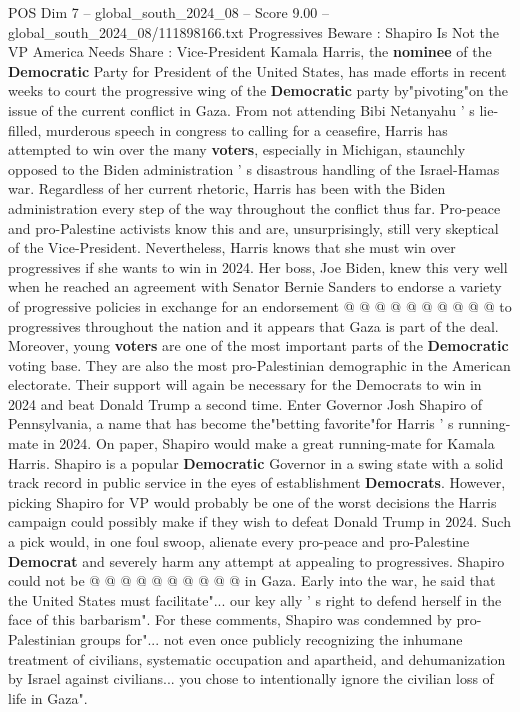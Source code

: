 \begin{textsample}{POS Dim 7 – global\_south\_2024\_08 – Score 9.00 – global\_south\_2024\_08/111898166.txt}  \label{ex:f7_pos_186}
Progressives Beware : Shapiro Is Not the VP America Needs Share : Vice-President Kamala Harris, the \textbf{nominee} of the \textbf{Democratic} Party for President of the United States, has made efforts in recent weeks to court the progressive wing of the \textbf{Democratic} party by"pivoting"on the issue of the current conflict in Gaza.
From not attending Bibi Netanyahu ' s lie-filled, murderous speech in congress to calling for a ceasefire, Harris has attempted to win over the many \textbf{voters}, especially in Michigan, staunchly opposed to the Biden administration ' s disastrous handling of the Israel-Hamas war.
Regardless of her current rhetoric, Harris has been with the Biden administration every step of the way throughout the conflict thus far.
Pro-peace and pro-Palestine activists know this and are, unsurprisingly, still very skeptical of the Vice-President.
Nevertheless, Harris knows that she must win over progressives if she wants to win in 2024.
Her boss, Joe Biden, knew this very well when he reached an agreement with Senator Bernie Sanders to endorse a variety of progressive policies in exchange for an endorsement @ @ @ @ @ @ @ @ @ @ to progressives throughout the nation and it appears that Gaza is part of the deal.
Moreover, young \textbf{voters} are one of the most important parts of the \textbf{Democratic} voting base.
They are also the most pro-Palestinian demographic in the American electorate.
Their support will again be necessary for the Democrats to win in 2024 and beat Donald Trump a second time.
Enter Governor Josh Shapiro of Pennsylvania, a name that has become the"betting favorite"for Harris ' s running-mate in 2024.
On paper, Shapiro would make a great running-mate for Kamala Harris.
Shapiro is a popular \textbf{Democratic} Governor in a swing state with a solid track record in public service in the eyes of establishment \textbf{Democrats}.
However, picking Shapiro for VP would probably be one of the worst decisions the Harris campaign could possibly make if they wish to defeat Donald Trump in 2024.
Such a pick would, in one foul swoop, alienate every pro-peace and pro-Palestine \textbf{Democrat} and severely harm any attempt at appealing to progressives.
Shapiro could not be @ @ @ @ @ @ @ @ @ @ in Gaza.
Early into the war, he said that the United States must facilitate"... our key ally ' s right to defend herself in the face of this barbarism".
For these comments, Shapiro was condemned by pro-Palestinian groups for"... not even once publicly recognizing the inhumane treatment of civilians, systematic occupation and apartheid, and dehumanization by Israel against civilians... you chose to intentionally ignore the civilian loss of life in Gaza".

\end{textsample}
